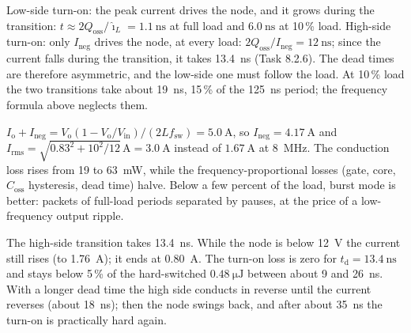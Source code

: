 \begin{solutionblock}
	Low-side turn-on: the peak current drives the node, and it grows during the transition: $t\approx2Q_\mathrm{oss}/\hat{\imath}_L=\SI{1.1}{\nano\second}$ at full load and $\SI{6.0}{\nano\second}$ at 10\,\% load.
	High-side turn-on: only $I_\mathrm{neg}$ drives the node, at every load: $2Q_\mathrm{oss}/I_\mathrm{neg}=\SI{12}{\nano\second}$; since the current falls during the transition, it takes \SI{13.4}{\nano\second} (Task 8.2.6).
	The dead times are therefore asymmetric, and the low-side one must follow the load. At 10\,\% load the two transitions take about \SI{19}{\nano\second}, 15\,\% of the \SI{125}{\nano\second} period; the frequency formula above neglects them.
\end{solutionblock}


\begin{solutionblock}
	$I_\mathrm{o}+I_\mathrm{neg}=V_\mathrm{o}(1-V_\mathrm{o}/V_\mathrm{in})/(2Lf_\mathrm{sw})=\SI{5.0}{\ampere}$, so $I_\mathrm{neg}=\SI{4.17}{\ampere}$ and $I_\mathrm{rms}=\sqrt{0.83^2+10^2/12}\,\si{\ampere}=\SI{3.0}{\ampere}$ instead of $\SI{1.67}{\ampere}$ at \SI{8}{\mega\hertz}. The conduction loss rises from 19 to \SI{63}{\milli\watt}, while the frequency-proportional losses (gate, core, $C_\mathrm{oss}$ hysteresis, dead time) halve. Below a few percent of the load, burst mode is better: packets of full-load periods separated by pauses, at the price of a low-frequency output ripple.
\end{solutionblock}


\begin{solutionblock}
	The high-side transition takes \SI{13.4}{\nano\second}. While the node is below \SI{12}{\volt} the current still rises (to \SI{1.76}{\ampere}); it ends at \SI{0.80}{\ampere}. The turn-on loss is zero for $t_\mathrm{d}=\SI{13.4}{\nano\second}$ and stays below 5\,\% of the hard-switched $\SI{0.48}{\micro\joule}$ between about 9 and \SI{26}{\nano\second}. With a longer dead time the high side conducts in reverse until the current reverses (about \SI{18}{\nano\second}); then the node swings back, and after about \SI{35}{\nano\second} the turn-on is practically hard again.
\end{solutionblock}

